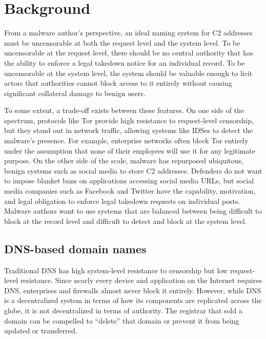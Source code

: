 \section{Background}

From a malware author's perspective, an ideal naming system for C2 
addresses must be uncensorable at both the request level and the system level. 
To be 
uncensorable at the request level, there should be no central authority that 
has the ability to enforce a legal takedown notice for an individual record. To 
be uncensorable at the system level, the system should be valuable enough to 
licit actors that authorities cannot block access to it entirely without 
causing significant collateral damage to benign users.

To some extent, a trade-off exists between these features. On 
one side of the 
spectrum, protocols like Tor provide high resistance to request-level 
censorship, but they stand out in network traffic, allowing systems like 
IDSes to detect the 
malware's presence. For example, enterprise networks often block Tor 
entirely under the assumption 
that none of their employees will use it for any legitimate purpose.
On the other side of 
the scale, malware has repurposed ubiquitous, benign systems 
such as social media to store C2 addresses. Defenders do not 
want to impose blanket bans on applications accessing social 
media URLs, but social media companies such as Facebook and 
Twitter have the capability, motivation, and legal obligation to enforce 
legal takedown requests on individual posts. Malware authors want to use 
systems that are balanced 
between being difficult to block at the record level and difficult to detect 
and block at the 
system level.

\subsection{DNS-based domain names}

Traditional DNS has high system-level resistance to censorship but low 
request-level resistance. 
Since nearly every device and application on the Internet requires DNS, 
enterprises and firewalls 
almost never block it entirely. However, while DNS is a decentralized 
system in terms of how its 
components are replicated across the globe, it is not decentralized in terms 
of authority. The 
registrar that sold a domain can be compelled to ``delete'' that domain or 
prevent it from being 
updated or transferred. 

